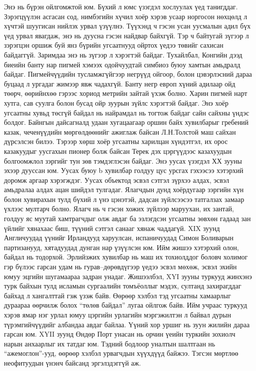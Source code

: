 Энэ нь бүрэн ойлгомжтой юм. Бүхий л юмс үзэгдэл хослуулах үед танигддаг. Зэрэгцүүлэн асгасан сод, нимбэгийн хүчил хоёр хэрэв усаар норгосон нөхцөлд л хүчтэй шуугисан нийлэх урвал үзүүлнэ. Түүхэнд ч гэсэн усан уусмалын адил бүх үед урвал явагдаж, энэ нь дуусна гэсэн найдвар байхгүй. Тэр ч байтугай зүгээр л зэрэгцэн оршиж буй янз бүрийн угсаатнууд ойртох үедээ төвийг сахисан байдаггүй. Заримдаа энэ нь зүгээр л хэрэгтэй байдаг. Тухайлбал, Конгийн дээд биеийн банту нар пигмей хэмээх одойчуудтай симбиоз буюу хамтын амьдралд байдаг. Пигмейчүүдийн тусламжгүйгээр негрүүд ойгоор, болон цэвэрлэсний дараа буцаад л ургадаг жимээр явж чадахгүй. Банту негр европ хүний адилаар ойд төөрч, өөрийнхөө гэрээс хориод метрийн зайтай үхэж болно. Харин пигмей нарт хутга, сав суулга болон бусад ойр зуурын зүйлс хэрэгтэй байдаг. Энэ хоёр угсаатны хувьд төсгүй байдал нь найрамдал нь тогтож байдаг сайн сайхны үндэс болдог.
Байнгын дайсагналд удаан хугацаагаар оршин байх хувилбарыг гребений казак, чеченүүдийн мөргөлдөөнийг ажиглаж байсан Л.Н.Толстой маш сайхан дүрсэлсэн билээ. Тэрээр хөрш хоёр угсаатны харилцан хүндэтгэл, их орос казакуудыг уусгахын пионер болж байсан Терек дэх цэргүүдээс казахуудын болгоомжлол зэргийг тун зөв тэмдэглэсэн байдаг. Энэ уусах үзэгдэл ХХ зууны эхээр дууссан юм.
Уусах буюу b хувилбар голдуу цус урсгах гэхээсээ хэтэрхий доромж аргаар хэрэгждэг. Уусах объектод эсвэл сэтгэл зүрхээ алдах, эсвэл амьдралаа алдах ацан шийдэл тулгадаг. Ялагчдын дунд хоёрдугаар зэргийн хүн болон хувирахын тулд бүхий л үнэ цэнэтэй, дадсан зүйлсээсээ татгалзах замаар үхлээс мултарч болно. Ялагч нь ч гэсэн хожих зүйлээр маруухан, их зантай, голдуу яс муутай хамтрагчдыг олж авдаг ба эзлэгдсэн угсаатны зөвхөн гадаад зан үйлийг хянахаас биш, түүний сэтгэл санааг хянаж чаддагүй. XIX зуунд Англичуудад үүнийг Ирландууд харуулсан, испаничуудад Симон Боливарын партизанууд, хятадуудад дунган нар үзүүлсэн юм. Ийм жишээ хэтэрхий олон, байдал нь тодорхой.
Эрлийзжих хувилбар нь маш их тохиолддог боловч холимог гэр бүлээс гарсан удам нь гурав–дөрөвдүгээр үедээ эсвэл мөхөж, эсвэл эхийн юмуу эцгийн шугамаараа задран унадаг. Жишээлбэл, XYI зууны туркууд жинхэнэ турк байхын тулд исламын сургаалийн томъёоллыг мэдэх, султанд захирагддаг байхад л хангалттай гэж үзэж байв. Өөрөөр хэлбэл тэд угсаатны хамаарлыг дураараа өөрчилж болох “төлөв байдал” лугаа ойлгож байв. Ийм учраас туркууд хэрэв ямар нэг урлал юмуу цэргийн урлагийн мэргэжилтэн л байвал дурын түрэмгийчүүдийг албандаа авдаг байлаа. Үүний хор уршиг нь зуун жилийн дараа гарсан юм.
XYII зуунд Өндөр Порт унасан нь орчин үеийн туркийн зохиолч нарын анхаарлыг их татдаг юм. Тэдний бодлоор уналтын шалтгаан нь “ажемоглон”-ууд, өөрөөр хэлбэл урвагчдын хүүхдүүд байжээ. Тэгсэн мөртлөө неофитуудын үнэнч байсанд эргэлздэггүй аж.
